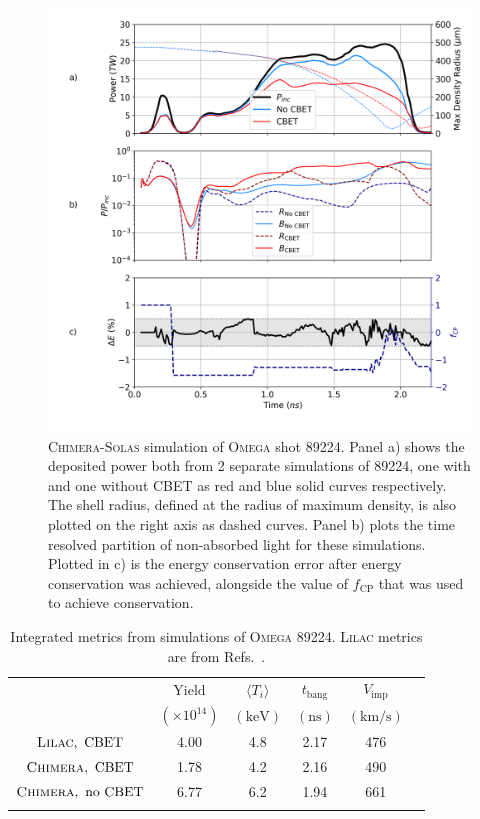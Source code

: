 \begin{figure}[t!]
    \includegraphics[width=0.9\linewidth]{Numerics/Images/89224_absorption.png}
    \centering
    \caption{\textsc{Chimera}-\textsc{Solas} simulation of \textsc{Omega} shot 89224.
    Panel a) shows the deposited power both from 2 separate simulations of 89224, one with and one without \ac{CBET} as red and blue solid curves respectively.
    The shell radius, defined at the radius of maximum density, is also plotted on the right axis as dashed curves.
    Panel b) plots the time resolved partition of non-absorbed light for these simulations.
    Plotted in c) is the energy conservation error after energy conservation was achieved, alongside the value of $f_{\text{CP}}$ that was used to achieve conservation.}%
    \label{fig:SOLAS_89224}
\end{figure}

\begin{table}[ht]
    \centering
    \caption{Integrated metrics from simulations of \textsc{Omega} 89224. \textsc{Lilac} metrics are from Refs.~\cite{patel_novel_2018,cao_interpreting_2019,crilly_neutron_2020}.}
    \begin{tabular}{cccccc} \hhline{=====}
    & $\text{Yield}$ & $\langle T_i \rangle$ & $t_{\text{bang}}$ & $V_{\text{imp}}$ \\ 
    & $\left(\times10^{14}\right)$ & $(\text{keV})$ & $(\text{ns})$ & $(\text{km/s})$ \\ 
    \hhline{-----}
    $\textsc{Lilac},\ \text{CBET}$ & 4.00 & 4.8 & 2.17 & 476  \\
    $\textsc{Chimera},\ \text{CBET}$ & 1.78 & 4.2 & 2.16 & 490  \\
    $\textsc{Chimera},\ \text{no CBET}$ & 6.77 & 6.2 & 1.94 & 661 \\ \hhline{======}
    \end{tabular}%
    \label{tab:SOLAS_89224_metrics}
\end{table}

